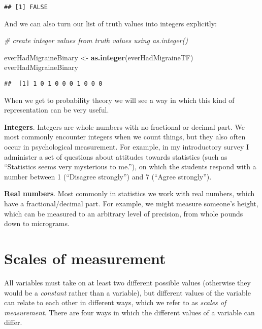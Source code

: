 \documentclass[]{book}
\newenvironment{Shaded}{\begin{snugshade}}{\end{snugshade}}
\newcommand{\KeywordTok}[1]{\textcolor[rgb]{0.13,0.29,0.53}{\textbf{#1}}}
\newcommand{\StringTok}[1]{\textcolor[rgb]{0.31,0.60,0.02}{#1}}
\newcommand{\CommentTok}[1]{\textcolor[rgb]{0.56,0.35,0.01}{\textit{#1}}}
\newcommand{\NormalTok}[1]{#1}
\theoremstyle{definition}
\theoremstyle{definition}
\theoremstyle{definition}
\theoremstyle{remark}
\begin{document}
\begin{verbatim}
## [1] FALSE
\end{verbatim}

And we can also turn our list of truth values into integers explicitly:

\begin{Shaded}
\begin{Highlighting}[]
\CommentTok{# create integer values from truth values using as.integer()}

\NormalTok{everHadMigraineBinary <-}\StringTok{ }\KeywordTok{as.integer}\NormalTok{(everHadMigraineTF)}
\NormalTok{everHadMigraineBinary}
\end{Highlighting}
\end{Shaded}

\begin{verbatim}
##  [1] 1 0 1 0 0 0 1 0 0 0
\end{verbatim}

When we get to probability theory we will see a way in which this kind
of representation can be very useful.

\textbf{Integers}. Integers are whole numbers with no fractional or
decimal part. We most commonly encounter integers when we count things,
but they also often occur in psychological measurement. For example, in
my introductory survey I administer a set of questions about attitudes
towards statistics (such as ``Statistics seems very mysterious to
me.''), on which the students respond with a number between 1
(``Disagree strongly'') and 7 (``Agree strongly'').

\textbf{Real numbers}. Most commonly in statistics we work with real
numbers, which have a fractional/decimal part. For example, we might
measure someone's height, which can be measured to an arbitrary level of
precision, from whole pounds down to micrograms.

\section{Scales of measurement}\label{scales-of-measurement}

All variables must take on at least two different possible values
(otherwise they would be a \emph{constant} rather than a variable), but
different values of the variable can relate to each other in different
ways, which we refer to as \emph{scales of measurement}. There are four
ways in which the different values of a variable can differ.
\end{document}
